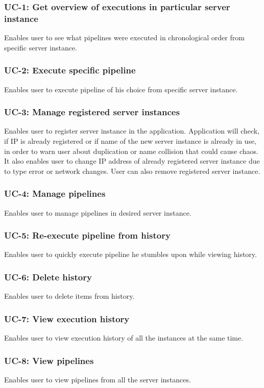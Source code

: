 \subsubsection*{UC-1: Get overview of executions in particular server instance}
Enables user to see what pipelines were executed in chronological order from specific server instance.
\subsubsection*{UC-2: Execute specific pipeline}
Enables user to execute pipeline of his choice from specific server instance.
\subsubsection*{UC-3: Manage registered server instances}
Enables user to register server instance in the application. Application will check, if IP is already registered or if name of the new server instance is already in use, in order to warn user about duplication or name collision that could cause chaos. It also enables user to change IP address of already registered server instance due to type error or network changes. User can also remove registered server instance.
\subsubsection*{UC-4: Manage pipelines}
Enables user to manage pipelines in desired server instance.
\subsubsection*{UC-5: Re-execute pipeline from history}
Enables user to quickly execute pipeline he stumbles upon while viewing history.
\subsubsection*{UC-6: Delete history}
Enables user to delete items from history.
\subsubsection*{UC-7: View execution history}
Enables user to view execution history of all the instances at the same time.
\subsubsection*{UC-8: View pipelines}
Enables user to view pipelines from all the server instances.
